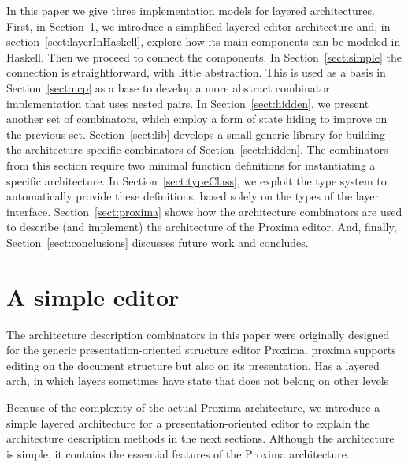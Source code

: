 \documentclass[preprint,natbib]{sigplanconf}
\begin{document}
In this paper we give three implementation models for layered architectures. First, in Section~\ref{sect:simpleEditor}, we introduce a simplified layered editor architecture and, in section~\ref{sect:layerInHaskell}, explore how its main components can be modeled in Haskell. Then we proceed to connect the components. In Section~\ref{sect:simple} the connection is straightforward, with little abstraction. This is used as a basis in Section~\ref{sect:ncp} as a base to develop a more abstract combinator implementation that uses nested pairs. In Section~\ref{sect:hidden}, we present another set of combinators, which employ a form of state hiding to improve on the previous set. Section~\ref{sect:lib} develops a small generic library for building the architecture-specific combinators of Section~\ref{sect:hidden}. The combinators from this section require two minimal function definitions for instantiating a specific architecture. In Section~\ref{sect:typeClass}, we exploit the type system to automatically provide these definitions, based solely on the types of the layer interface. Section~\ref{sect:proxima} shows how the architecture combinators are used to describe (and implement) the architecture of the Proxima editor. And, finally, Section~\ref{sect:conclusions} discusses future work and concludes.
			
			
			
\section{A simple editor}\label{sect:simpleEditor}

The architecture description combinators in this paper were originally designed for the generic presentation-oriented structure editor Proxima. proxima supports editing on the document structure but also on its presentation. Has a layered arch, in which layers sometimes have state that does not belong on other levels

Because of the complexity of the actual Proxima architecture, we introduce a simple layered architecture for a presentation-oriented editor to explain the architecture description methods in the next sections. Although the architecture is simple, it contains the essential features of the Proxima architecture. 
\end{document}
